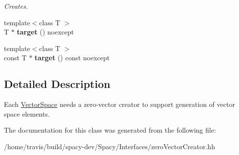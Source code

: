 \begin{DoxyCompactItemize}
\begin{DoxyCompactList}\small\item\em Creates. \end{DoxyCompactList}\item 
\hypertarget{classSpacy_1_1ZeroVectorCreator_ac6a6c8b0148da2ac7fc55fe1cc062321}{{\footnotesize template$<$class T $>$ }\\T $\ast$ {\bfseries target} () noexcept}\label{classSpacy_1_1ZeroVectorCreator_ac6a6c8b0148da2ac7fc55fe1cc062321}

\item 
\hypertarget{classSpacy_1_1ZeroVectorCreator_a49fff06a4dc43f027eef5db923d3aad4}{{\footnotesize template$<$class T $>$ }\\const T $\ast$ {\bfseries target} () const noexcept}\label{classSpacy_1_1ZeroVectorCreator_a49fff06a4dc43f027eef5db923d3aad4}

\end{DoxyCompactItemize}


\subsection{Detailed Description}
Each \hyperlink{classSpacy_1_1VectorSpace}{Vector\-Space} needs a zero-\/vector creator to support generation of vector space elements. 

The documentation for this class was generated from the following file\-:\begin{DoxyCompactItemize}
\item 
/home/travis/build/spacy-\/dev/\-Spacy/\-Interfaces/zero\-Vector\-Creator.\-hh\end{DoxyCompactItemize}
